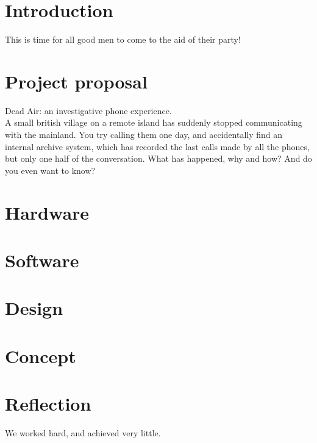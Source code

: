 \documentclass[12pt]{article}
\begin{document}
\maketitle

\section{Introduction}
This is time for all good men to come to the aid of their party!

\section{Project proposal} %
Dead Air: an investigative phone experience.\\
A small british village on a remote island has suddenly stopped communicating with the mainland. 
You try calling them one day, and accidentally find an internal archive system, 
which has recorded the last calls made by all the phones, but only one half of the conversation. 
What has happened, why and how? And do you even want to know?

\section{Hardware} %

\section{Software} %

\section{Design} %



\section{Concept} %

\section{Reflection} %
We worked hard, and achieved very little.
\end{document}

